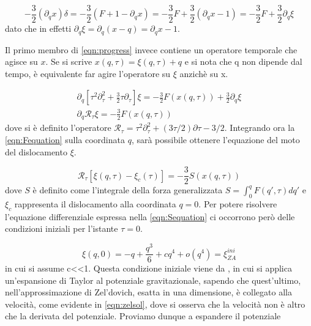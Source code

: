 \begin{equation}
    -\frac{3}{2} (\partial_q x )\delta = -\frac{3}{2}(F+1-\partial_q x) = -\frac{3}{2} F +\frac{3}{2} (\partial_q x - 1) = -\frac{3}{2} F + \frac{3}{2} \partial_q \xi    
\end{equation}
dato che in effetti $\partial_q \xi = \partial_q (x-q) = \partial_q x - 1$. 

Il primo membro di \ref{eqn:progress} invece contiene un operatore temporale che agisce su $x$. Se si scrive $x(q,\tau) = \xi(q, \tau) + q$ e si nota che q non 
dipende dal tempo, è equivalente far agire l'operatore su $\xi$ anzichè su x. 

\begin{gather}
    \partial_q \left[ \tau^2 \partial^2_{\tau}+\frac{3}{2}\tau\partial_{\tau} \right] \xi = -\frac{3}{2}F(x(q,\tau)) +\frac{3}{2}\partial_q \xi \\
    \label{eqn:Fequation}
    \partial_q \mathcal{R}_{\tau}\xi = -\frac{3}{2}F(x(q, \tau))
\end{gather}
dove si è definito l'operatore $\mathcal{R}_{\tau} = \tau^2\partial^2_{\tau} + (3\tau/2)\partial\tau-3/2$.
Integrando ora la \ref{eqn:Fequation} sulla coordinata $q$, sarà possibile ottenere l'equazione 
del moto del dislocamento $\xi$.

\begin{equation}
    \label{eqn:Sequation}
    \mathcal{R}_{\tau}[\xi(q, \tau)-\xi_c(\tau)] = -\frac{3}{2}S(x(q, \tau))
\end{equation}
dove $S$ è definito come l'integrale della forza generalizzata $S = \int_0^q F(q',\tau)dq'$ e $\xi_c$ rappresenta il 
dislocamento alla coordinata $q=0$.
Per potere risolvere l'equazione differenziale espressa nella \ref{eqn:Sequation} ci occorrono
però delle condizioni iniziali per l'istante $\tau = 0$.

\begin{equation}
    \label{eqn:initcond}
    \xi(q, 0) = -q + \frac{q^3}{6} + cq^4 + o(q^4) = \xi_{ZA}^{ini}
\end{equation}
in cui si assume c<\!<1. Questa condizione iniziale viene da \cite{zeldovich}, in cui si applica
un'espansione di Taylor al potenziale gravitazionale, sapendo che quest'ultimo, nell'approssimazione di Zel'dovich, 
esatta in una dimensione, è collegato alla velocità, come evidente in \ref{eqn:zelsol}, dove si osserva che la 
velocità non è altro che la derivata del potenziale. Proviamo dunque a espandere il potenziale


